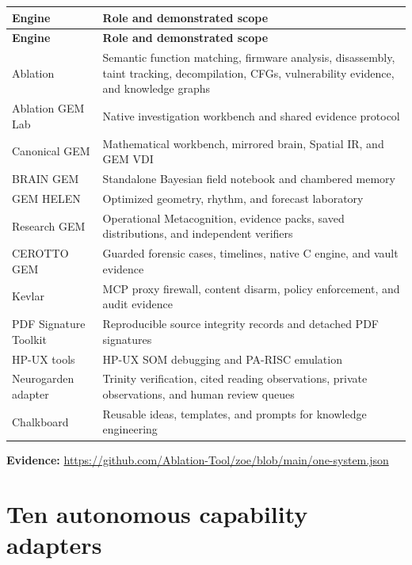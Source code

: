 \documentclass[11pt]{article}
\newcommand{\evidence}[1]{\par\smallskip\small\color{ZoeGray}\textbf{Evidence:} #1\normalsize\par\smallskip}
\begin{document}
\begin{longtable}{p{}p{}}
\toprule
\textbf{Engine} & \textbf{Role and demonstrated scope}\\
\midrule
\endfirsthead
\toprule
\textbf{Engine} & \textbf{Role and demonstrated scope}\\
\midrule
\endhead
Ablation & Semantic function matching, firmware analysis, disassembly, taint tracking, decompilation, CFGs, vulnerability evidence, and knowledge graphs\\
Ablation GEM Lab & Native investigation workbench and shared evidence protocol\\
Canonical GEM & Mathematical workbench, mirrored brain, Spatial IR, and GEM VDI\\
BRAIN GEM & Standalone Bayesian field notebook and chambered memory\\
GEM HELEN & Optimized geometry, rhythm, and forecast laboratory\\
Research GEM & Operational Metacognition, evidence packs, saved distributions, and independent verifiers\\
CEROTTO GEM & Guarded forensic cases, timelines, native C engine, and vault evidence\\
Kevlar & MCP proxy firewall, content disarm, policy enforcement, and audit evidence\\
PDF Signature Toolkit & Reproducible source integrity records and detached PDF signatures\\
HP-UX tools & HP-UX SOM debugging and PA-RISC emulation\\
Neurogarden adapter & Trinity verification, cited reading observations, private observations, and human review queues\\
Chalkboard & Reusable ideas, templates, and prompts for knowledge engineering\\
\bottomrule
\end{longtable}

\evidence{\url{https://github.com/Ablation-Tool/zoe/blob/main/one-system.json}}

\clearpage
\section{Ten autonomous capability adapters}
\end{document}

